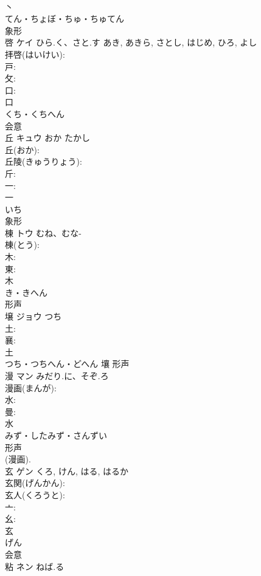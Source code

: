 \documentclass[8pt]{extreport}
\begin{document}
\begin{CJK}{UTF8}{min}
\\	丶	
\\	てん・ちょぼ・ちゅ・ちゅてん	
\\	象形 
\\	啓	ケイ	ひら.く、さと.す	あき, あきら, さとし, はじめ, ひろ, よし	
\\	拝啓(はいけい): 
\\	戸: 
\\	攵: 
\\	口: 
\\	口	
\\	くち・くちへん	
\\	会意 
\\	丘	キュウ	おか	たかし	
\\	丘(おか): 
\\	丘陵(きゅうりょう): 
\\	斤: 
\\	一: 
\\	一	
\\	いち	
\\	象形 
\\	棟	トウ	むね、むな-		
\\	棟(とう): 
\\	木: 
\\	東: 
\\	木	
\\	き・きへん	
\\	形声 
\\	壌	ジョウ	つち		
\\	土: 
\\	襄: 
\\	土	
\\	つち・つちへん・どへん	壤	形声 
\\	漫	マン	みだり.に、そぞ.ろ		
\\	漫画(まんが): 
\\	水: 
\\	曼: 
\\	水	
\\	みず・したみず・さんずい	
\\	形声 
\\	(漫画). 
\\	玄	ゲン		くろ, けん, はる, はるか	
\\	玄関(げんかん): 
\\	玄人(くろうと): 
\\	亠: 
\\	幺: 
\\	玄	
\\	げん	
\\	会意 
\\	粘	ネン	ねば.る		

\end{CJK}
\end{document}
